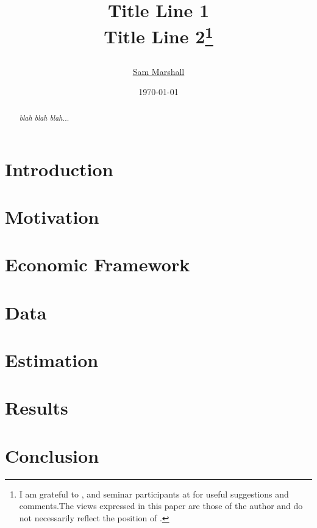 \documentclass[12pt]{article}
\title{Title Line 1 \\ Title Line 2\thanks{I am grateful to \thxppl, and seminar participants at \thxplaces for useful suggestions and comments.The views expressed in this paper are those of the author and do not necessarily reflect the position of \inst.} \author{ \href{mailto:samuel.m.marshall.12@dartmouth.edu}{Sam Marshall} \\ \small{\inst}}
	\date{\footnotesize{\monthyeardate\today}}}
\begin{document}
	
	
	\maketitle
	
	\begin{abstract}
		\begin{onehalfspace}
			\noindent
			\textit{blah blah blah...}
			
			\pagebreak
		\end{onehalfspace}
		
		
	\end{abstract}
	
	\doublespacing
	
	
	\section{Introduction}
	
	
	
	\section{Motivation}
	
	
	\section{Economic Framework} \label{s:EconomicFramework}
	
	
	\section{Data} \label{s:Data}
	
	
	\section{Estimation}\label{s:Estimation}
	
	
	\section{Results} \label{s:Results}
	
	
	\section{Conclusion} \label{s:Conclusion}
	
	
	
\end{document}
